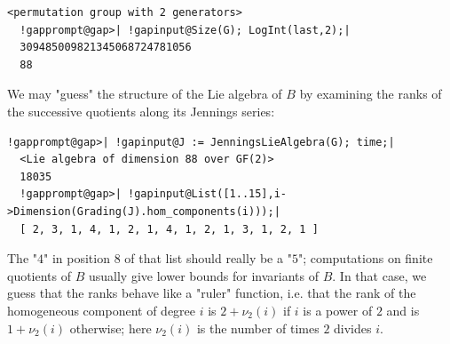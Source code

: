 \documentclass[a4paper,11pt]{report}
\begin{document}
{{\begin{Verbatim}[commandchars=!@|,fontsize=\small,frame=single,label=Example]
  <permutation group with 2 generators>
  !gapprompt@gap>| !gapinput@Size(G); LogInt(last,2);|
  309485009821345068724781056
  88
\end{Verbatim}
 We may "guess" the structure of the Lie algebra of $B$ by examining the ranks of the successive quotients along its Jennings series: 
\begin{Verbatim}[commandchars=!@|,fontsize=\small,frame=single,label=Example]
  !gapprompt@gap>| !gapinput@J := JenningsLieAlgebra(G); time;|
  <Lie algebra of dimension 88 over GF(2)>
  18035
  !gapprompt@gap>| !gapinput@List([1..15],i->Dimension(Grading(J).hom_components(i)));|
  [ 2, 3, 1, 4, 1, 2, 1, 4, 1, 2, 1, 3, 1, 2, 1 ]
\end{Verbatim}
 The "$4$" in position $8$ of that list should really be a "$5$"; computations on finite quotients of $B$ usually give lower bounds for invariants of $B$. In that case, we guess that the ranks behave like a "ruler" function, i.e.
that the rank of the homogeneous component of degree $i$ is $2+\nu_2(i)$ if $i$ is a power of $2$ and is $1+\nu_2(i)$ otherwise; here $\nu_2(i)$ is the number of times $2$ divides $i$. }

 }

 
\end{document}

